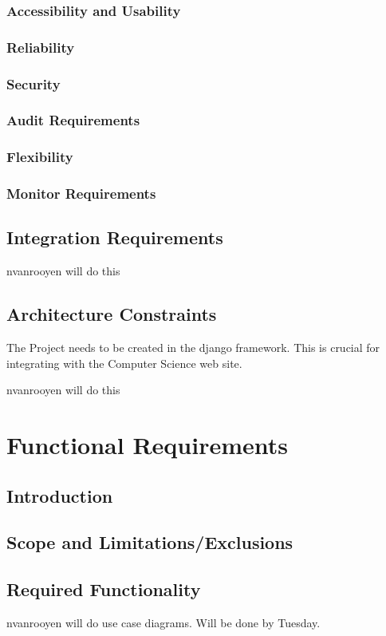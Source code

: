 \documentclass[12pt,a4paper]{article}
\begin{document}
\subsubsection{Accessibility and Usability}
\subsubsection{Reliability}
\subsubsection{Security}
\subsubsection{Audit Requirements}
\subsubsection{Flexibility}
\subsubsection{Monitor Requirements}
\subsection{Integration Requirements}
\begin{Huge} nvanrooyen will do this \end{Huge}
\subsection{Architecture Constraints}
The Project needs to be created in the django framework. This is crucial for integrating with the Computer Science web site.\\
\begin{Huge} nvanrooyen will do this \end{Huge}
\section{Functional Requirements}
\subsection{Introduction}
\subsection{Scope and Limitations/Exclusions}
\subsection{Required Functionality}
nvanrooyen will do use case diagrams. Will be done by Tuesday.
\end{document}
